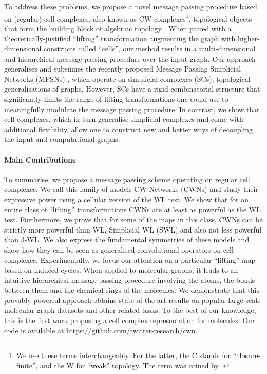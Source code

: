 \documentclass{article}
\begin{document}
To address these problems, we propose a novel message passing procedure based on (regular) cell complexes, also known as CW complexes\footnote{We use these terms interchangeably. For the latter, the C stands for ``closure-finite'', and the W for ``weak'' topology. The term was coined by \citet{bams/1183513543}.}, topological objects that form the building block of algebraic topology \citep{hatcher_book}. When paired with a theoretically-justified ``lifting'' transformation augmenting the graph with higher-dimensional constructs called ``cells'', our method results in a multi-dimensional and hierarchical message passing procedure over the input graph. Our approach generalises and subsumes the recently proposed Message Passing Simplicial Networks (MPSNs) \citep{bodnar2021weisfeiler}, which operate on simplicial complexes (SCs), topological generalisations of graphs. However, SCs have a rigid combinatorial structure that significantly limits the range of lifting transformations one could use to meaningfully modulate the message passing procedure. In contrast, we show that cell complexes, which in turn generalise simplicial complexes and come with additional flexibility, allow one to construct new and better ways of decoupling the input and computational graphs. 

\paragraph{Main Contributions} To summarise, we propose a message passing scheme operating on regular cell complexes. We call this family of models CW Networks (CWNs) and study their expressive power using a cellular version of the WL test. We show that for an entire class of ``lifting'' transformations CWNs are at least as powerful as the WL test. Furthermore, we prove that for some of the maps in this class, CWNs can be strictly more powerful than WL, Simplicial WL (SWL) and also not less powerful than 3-WL. We also express the fundamental symmetries of these models and show how they can be seen as generalised convolutional operators on cell complexes. Experimentally, we focus our attention on a particular ``lifting'' map based on induced cycles. When applied to molecular graphs, it leads to an intuitive hierarchical message passing procedure involving the atoms, the bonds between them and the chemical rings of the molecules. We demonstrate that this provably powerful approach obtains state-of-the-art results on popular large-scale molecular graph datasets and other related tasks. To the best of our knowledge, this is the first work proposing a cell complex representation for molecules. Our code is available at \url{https://github.com/twitter-research/cwn}. 
\end{document}
